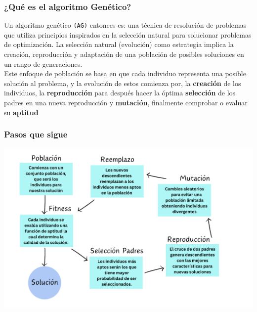 \subsubsection*{¿Qué es el algoritmo Genético?}

Un algoritmo genético \texttt{(AG)} entonces es: una técnica de resolución de problemas 
que utiliza principios inspirados en la selección natural para solucionar problemas de 
optimización. La selección natural (evolución) como estrategia implica la creación, 
reproducción y adaptación de una población de posibles soluciones en un rango de generaciones.\\ 

Este enfoque de población se basa en que cada individuo representa una posible solución 
al problema, y la evolución de estos comienza por, la \textbf{creación} de los individuos, 
la \textbf{reproducción} para después hacer la óptima \textbf{selección} de los padres en 
una nueva reproducción y \textbf{mutación}, finalmente comprobar o evaluar su \textbf{aptitud}\\ 


\subsubsection*{Pasos que sigue}

\begin{center}
    \includegraphics[scale = .4]{IMA/algo genetico.png}
\end{center}
